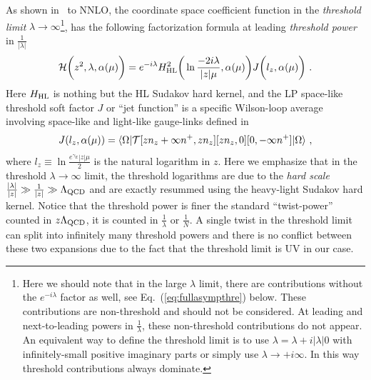 \documentclass[a4paper,11pt]{article}
\begin{document}
As shown in~\cite{Ji:2023pba} to NNLO, the coordinate space coefficient function in the {\it threshold limit} $\lambda \rightarrow \infty$\footnote{Here we should note that in the large $\lambda$ limit, there are contributions without the $e^{-i\lambda}$ factor as well, see Eq.~(\ref{eq:fullasympthre}) below. These contributions are non-threshold and should not be considered. At leading and next-to-leading powers in $\frac{1}{\lambda}$, these non-threshold contributions do not appear. An equivalent way to define the threshold limit is to use $\lambda=\lambda+i|\lambda|0$ with infinitely-small positive imaginary parts or simply use $\lambda \rightarrow +i\infty$. In this way threshold contributions always dominate. }, has the following factorization formula at leading {\it threshold power} in $\frac{1}{|\lambda|}$ 
\begin{align}\label{eq:threshfac}
{\cal H} \bigg(z^2,\lambda,\alpha(\mu)\bigg)=e^{-i\lambda}H^2_{\rm HL}\bigg(\ln \frac{-2i\lambda}{|z|\mu},\alpha(\mu)\bigg)J\bigg(l_z,\alpha(\mu )\bigg) \ .
\end{align}
Here $H_{\rm HL}$ is nothing but the HL Sudakov hard kernel, and the LP space-like threshold soft factor $J$ or ``jet function'' is a specific Wilson-loop average involving space-like and light-like gauge-links defined in~\cite{Ji:2023pba}
\begin{align}\label{eq:defJ}
J(l_z,\alpha(\mu))=\langle \Omega|{\cal T}[zn_z+\infty n^+,zn_z][zn_z,0][0,-\infty n^+]|\Omega\rangle \ ,
\end{align}
where $l_z \equiv \ln \frac{e^{\gamma_E}|z|\mu}{2}$ is the natural logarithm in $z$. Here we emphasize that in the threshold $\lambda \rightarrow \infty$ limit, the threshold logarithms are due to the {\it hard scale} $\frac{|\lambda|}{|z|} \gg \frac{1}{|z|} \gg \Lambda_{\rm QCD}$ and are exactly resummed using the heavy-light Sudakov hard kernel. Notice that the threshold power is finer the standard ``twist-power'' counted in $z\Lambda_{\rm QCD}$, it is counted in $\frac{1}{\lambda}$ or $\frac{1}{N}$. A single twist in the threshold limit can split into infinitely many threshold powers and there is no conflict between these two expansions due to the fact that the threshold limit is UV in our case. 
\end{document}

